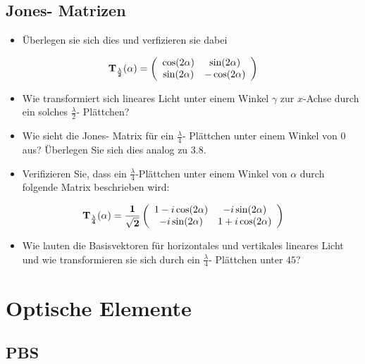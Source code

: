 \documentclass[a4paper,oneside]{article}
\begin{document}
\subsection{Jones- Matrizen}
\begin{itemize}
\item Überlegen sie sich dies und verfizieren sie dabei
\end{itemize}
$$ \bf{T}_{\frac{\lambda}{2}}(\alpha) = \left( \begin{array}{cc}
\cos (2\alpha)&\sin (2\alpha) \\
\sin (2\alpha)&-\cos (2\alpha)
\end{array} \right) $$
\begin{itemize}
\item Wie transformiert sich lineares Licht unter einem Winkel $\gamma$ zur $x$-Achse durch ein solches $\frac{\lambda}{2}$- Plättchen?
\end{itemize}
\begin{itemize}
\item Wie sieht die Jones- Matrix für ein $\frac{\lambda}{4}$- Plättchen unter einem Winkel von $0$\textdegree aus? Überlegen Sie sich dies analog zu 3.8.
\end{itemize}
\begin{itemize}
\item Verifizieren Sie, dass ein $\frac{\lambda}{4}$-Plättchen unter einem Winkel von $\alpha$ durch folgende Matrix beschrieben wird:
\end{itemize}
$$\bf{T}_\frac{\lambda}{4}(\alpha)=\frac{1}{\sqrt{2}}
\left(
\begin{array}{cc}
 1-i\cos(2\alpha)&-i\sin(2\alpha)\\
-i\sin(2\alpha)&1+i\cos(2\alpha)
\end{array}
\right)
$$

\begin{itemize}
\item Wie lauten die Basisvektoren für horizontales und vertikales lineares Licht und wie transformieren sie sich durch ein $\frac{\lambda}{4}$- Plättchen unter $45$\textdegree?
\end{itemize}


\clearpage
\section{Optische Elemente}
\subsection{PBS}
\label{pbs}
\end{document}
